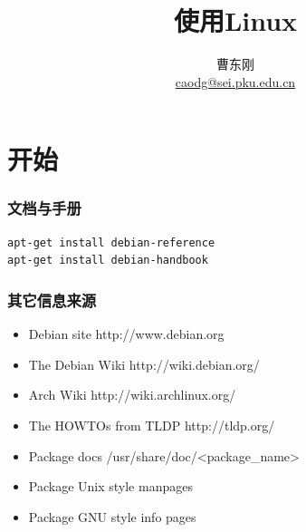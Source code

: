 \documentclass[compress]{beamer}
\begin{document}
					
\title{使用Linux}

\author[\href{http://c.pku.edu.cn/}{http://c.pku.edu.cn/}]
{曹东刚\\\href{mailto:caodg@sei.pku.edu.cn}{caodg@sei.pku.edu.cn}}


\date{}


\begin{frame}
	\titlepage
\end{frame}

\section{开始}

\begin{frame}[containsverbatim]
\frametitle{文档与手册}
\begin{Verbatim}
apt-get install debian-reference
apt-get install debian-handbook
\end{Verbatim}
\end{frame}


\begin{frame}[containsverbatim]
\frametitle{其它信息来源}
\begin{itemize}
\item Debian site http://www.debian.org
\item The Debian Wiki http://wiki.debian.org/ 
\item Arch Wiki http://wiki.archlinux.org/
\item The HOWTOs from TLDP http://tldp.org/
\item Package docs /usr/share/doc/<package\_name>
\item Package Unix style manpages 
\item Package GNU style info pages
\end{itemize}
\end{frame}
\end{document}

